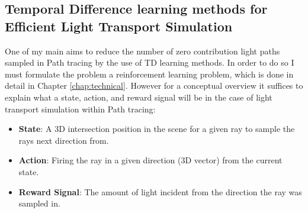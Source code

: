 \documentclass[ %
                    author={Callum Pearce},
                supervisor={Dr. Neill Campbell},
                    degree={MEng},
                     title={How effective are Temporal difference learning methods for reducing the number of zero contribution light paths, while still accurately approximating Global Illumination in Path tracing?},
                  subtitle={},
                      type={research},
                      year={2019} ]{dissertation}
\begin{document}

\subsection{Temporal Difference learning methods for Efficient Light Transport Simulation}

One of my main aims to reduce the number of zero contribution light paths sampled 
in Path tracing by the use of TD learning methods. In order to do so I must formulate 
the problem a reinforcement learning problem, which is done in detail in Chapter
\ref{chap:technical}. However for a conceptual overview it suffices to explain what a 
state, action, and reward signal will be in the case of light transport simulation within 
Path tracing:

\begin{itemize}

\item \textbf{State}: A 3D intersection position in the scene for a given ray to sample 
the rays next direction from. 

\item \textbf{Action}: Firing the ray in a given direction (3D vector) from the current 
state.

\item \textbf{Reward Signal}: The amount of light incident from the direction the ray 
was sampled in.

\end{itemize}
\end{document}
